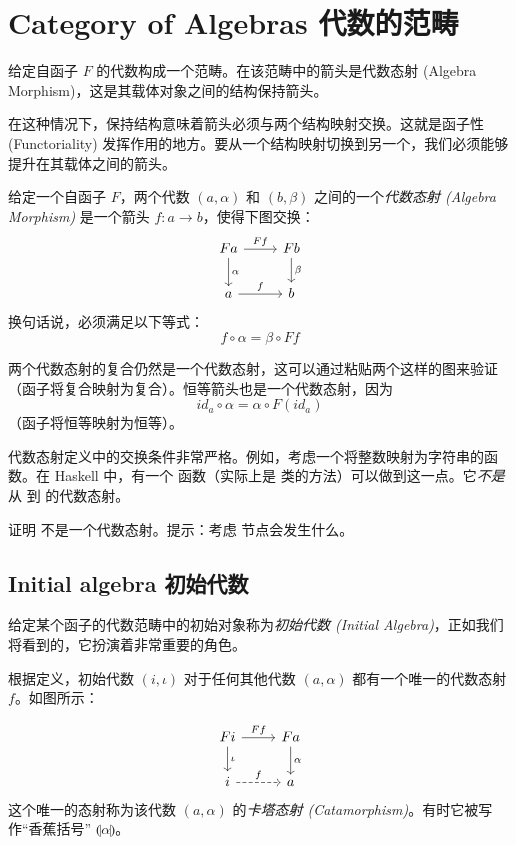 \documentclass[DaoFP]{subfiles}
\begin{document}
 \section{Category of Algebras 代数的范畴}

 给定自函子 $F$ 的代数构成一个范畴。在该范畴中的箭头是代数态射 (Algebra Morphism)，这是其载体对象之间的结构保持箭头。

 在这种情况下，保持结构意味着箭头必须与两个结构映射交换。这就是函子性 (Functoriality) 发挥作用的地方。要从一个结构映射切换到另一个，我们必须能够提升在其载体之间的箭头。

 给定一个自函子 $F$，两个代数 $(a, \alpha)$ 和 $(b, \beta)$ 之间的一个\emph{代数态射 (Algebra Morphism)} 是一个箭头 $f \colon a \to b$，使得下图交换：
 \[
  \begin{tikzcd}
   F a
   \arrow[r, "F f"]
   \arrow[d, "\alpha"]
   & F b
   \arrow[d, "\beta"]
   \\
   a
   \arrow[r, "f"]
   & b
  \end{tikzcd}
 \]
 换句话说，必须满足以下等式：
 \[f \circ \alpha = \beta \circ F f \]

 两个代数态射的复合仍然是一个代数态射，这可以通过粘贴两个这样的图来验证（函子将复合映射为复合）。恒等箭头也是一个代数态射，因为
 \[ id_a \circ \alpha = \alpha \circ F (id_a) \]
 （函子将恒等映射为恒等）。

 代数态射定义中的交换条件非常严格。例如，考虑一个将整数映射为字符串的函数。在 Haskell 中，有一个  函数（实际上是  类的方法）可以做到这一点。它\emph{不是}从  到  的代数态射。

 \begin{exercise}
  证明  不是一个代数态射。提示：考虑  节点会发生什么。
 \end{exercise}

 \subsection{Initial algebra 初始代数}

 给定某个函子的代数范畴中的初始对象称为\emph{初始代数 (Initial Algebra)}，正如我们将看到的，它扮演着非常重要的角色。

 根据定义，初始代数 $(i, \iota)$ 对于任何其他代数 $(a, \alpha)$ 都有一个唯一的代数态射 $f$。如图所示：

 \[
  \begin{tikzcd}
   F i
   \arrow[r, "F f"]
   \arrow[d, "\iota"]
   & F a
   \arrow[d, "\alpha"]
   \\
   i
   \arrow[r, dashed, "f"]
   & a
  \end{tikzcd}
 \]
 这个唯一的态射称为该代数 $(a, \alpha)$ 的\emph{卡塔态射 (Catamorphism)}。有时它被写作\index{$\llparenthesis \rrparenthesis$}``香蕉括号'' $\llparenthesis \alpha \rrparenthesis$。
\end{document}
